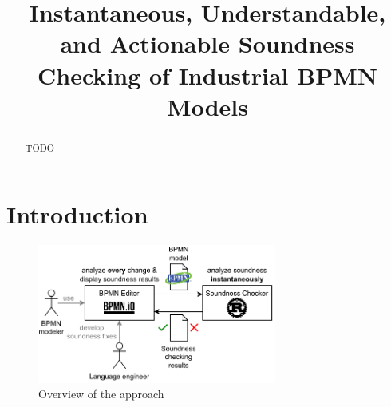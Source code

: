 \documentclass[runningheads]{llncs}
\begin{document}
%
\title{Instantaneous, Understandable, and Actionable Soundness Checking of Industrial BPMN Models}
%
%
%
\maketitle              %
%
\begin{abstract}
TODO
\end{abstract}


\renewcommand{\labelenumi}{(\textbf{\arabic{enumi})}}

\section{Introduction} \label{sec:introduction}

\cite{fahlandAnalysisDemandInstantaneous2011}




\begin{figure}[ht]
	\centering
	\includegraphics[width=0.7\textwidth]{images/overview}
	\caption{Overview of the approach}
	\label{fig:overview}
\end{figure}
\end{document}
